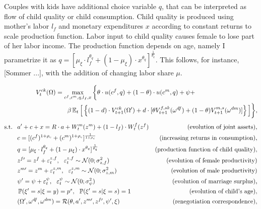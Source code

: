 Couples with kids have additional choice variable $q$, that can be interpreted as flow of child quality or child consumption. Child quality is produced using mother's labor $l_f$ and monetary expenditures $x$ according to constant returns to scale production function. Labor input to child quality causes female to lose part of her labor income. The production function depends on age, namely I parametrize it as $q = [\mu_\xi\cdot l_f^{\theta_q} + (1-\mu_\xi)\cdot x^{\theta_q}]^{\frac1{\theta_q}}$. This follows, for instance, [Sommer ...], with the addition of changing labor share $\mu$.

\begin{align}& \hspace{5em}  V^{ck}_t(\Omega) = \max\limits_{c^f,c^m,q,l_f,x}  \bigg\{ \theta\cdot u(c^f,q) + (1-\theta)\cdot u(c^m,q) + \psi + \label{vf_ck} \\  \nonumber
 & \hspace{10em} \beta \E_t \Big[   \left\{ (1-d)\cdot   V^{ck}_{t+1}(\Omega') + d\cdot [ \theta V_{t+1}^{f,sk}(\omega^{df}) + (1-\theta)V_{t+1}^{m,s}(\omega^{dm})]\right\} \Big] \bigg\},
\end{align}\vspace{-2em}
\begin{align*}
\text{s.t. \ } & a' + c + x = R\cdot a  + W^m_t(z^m) + (1-l_f)\cdot W^f_t(z^f) & \text{(evolution of joint assets)},\\
                    & c = [(c^f)^{1+\rho_c} + (c^m)^{1+\rho_c}]^{\frac1{1+\rho_c}} & \text{(increasing returns in consumption)},\\
                    & q = [\mu_\xi\cdot l_f^{\theta_q} + (1-\mu_\xi)\cdot x^{\theta_q}]^{\frac1{\theta_q}} & \text{(production function of child quality)},\\
                    &  z^{f\prime} = z^f + \varepsilon^{z,f}_t, \ \ \varepsilon^{z,f}_t \sim \mathcal{N}(0;\sigma_{z,f}^2) &  \text{ (evolution of female productivity)}\\
				 &  z^{m\prime} = z^m + \varepsilon^{z,m}_t, \ \ \varepsilon^{z,m}_t \sim \mathcal{N}(0;\sigma_{z,m}^2) &  \text{ (evolution of male productivity)}\\
                    & \psi' = \psi + \varepsilon^{\psi}_t, \ \ \varepsilon^{\psi}_t \sim \mathcal{N}(0;\sigma_{\psi}^2)  & \text{(evolution of marriage surplus),} \\
                   &  \P(\xi' = s | \xi = y) = p^s, \ \ \P(\xi' = s | \xi = s) = 1 & \text{(evolution of child's age)},\\
                    & (\Omega',\omega^{df},\omega^{dm}) = \mathcal{R}(\theta,a',z^{m\prime},z^{f\prime},\psi',\xi) & \text{(renegotiation correspondence)},
\end{align*}

